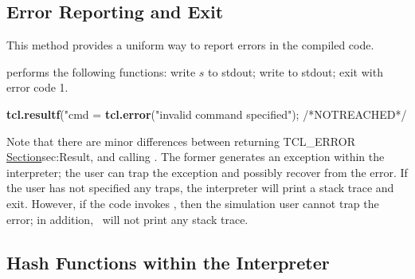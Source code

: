 \subsection{Error Reporting and Exit}
\label{sec:ErrorReporting}

This method provides a uniform way to report errors in the compiled code.
\begin{list}{\textbullet}{}
\item {}
performs the following functions:
write $s$ to stdout; write  to stdout;
exit with error code 1.
\end{list}
\begin{program}
        {\bfseries{}tcl.resultf}("cmd = %
        {\bfseries{}tcl.error}("invalid command specified");
        /*{\cf{}NOTREACHED}*/
\end{program}

Note that
there are minor differences between returning TCL\_ERROR
\href{as we did in the previous subsection}{Section}{sec:Result},
and calling .
The former generates an exception within the interpreter;
the user can trap the exception and possibly recover from the error.
If the user has not specified any traps, 
the interpreter will print a stack trace and exit.
However, if the code invokes ,
then the simulation user cannot trap the error;
in addition, \ns\ will not print any stack trace.

\subsection{Hash Functions within the Interpreter}
\label{sec:HashTables}

